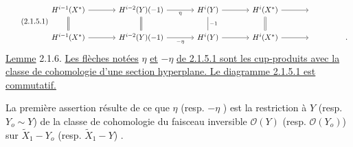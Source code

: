 
\begin{equation}\tag{2.1.5.1}
\begin{tikzcd}[column sep=large]
H^{i-1}(X^*) \arrow[r] \arrow[d, equal] & H^{i-2}(Y)(-1) \arrow[r, "\eta"'] \arrow[d, equal] & H^i(Y) \arrow[r] \arrow[d, dash, "-1"] & H^i(X^*) \arrow[r] \arrow[d, equal] & {} & {} \\
H^{i-1}(X^*) \arrow[r] & H^{i-2}(Y)(-1) \arrow[r, "-\eta"'] & H^i(Y) \arrow[r] & H^i(X^*) \arrow[r] & {} & \mbox{.}
\end{tikzcd}
\end{equation}
\underline{Lemme} 2.1.6.  \underline{Les flèches notées} $\eta$ \underline{et} $-\eta$ \underline{de 2.1.5.1 sont les cup-produits avec la classe de cohomologie d'une section hyperplane. Le diagramme 2.1.5.1 est commutatif.}

La première assertion résulte de ce que $\eta$ (resp. $-\eta$ ) est la restriction à $Y$ (resp. $Y_o \sim Y$) de la classe de cohomologie du faisceau inversible $\mathcal{O}(Y)$ (resp. $\mathcal{O}(Y_o)$) sur $\widetilde{X}_1 - Y_o$ (resp. $\widetilde{X}_1 - Y$) .

